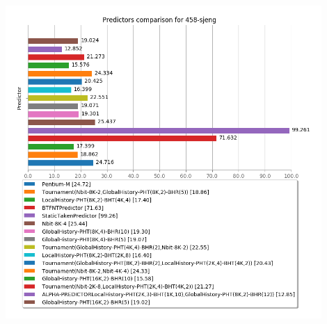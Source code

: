    \begin{minipage}{\textwidth}
      \begin{center}
         \\
         \vspace{3mm}
         \includegraphics[width=0.9\textwidth, frame]{./graphs/4-5/458-sjeng.png}
         \vspace{6mm}
      \end{center}
   \end{minipage}

